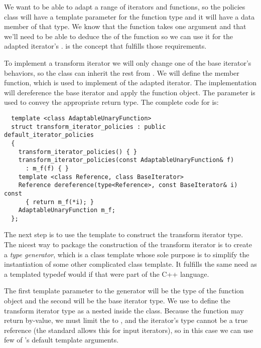\documentclass{netobjectdays}
\begin{document}
We want to be able to adapt a range of iterators and functions, so the
policies class will have a template parameter for the function type
and it will have a data member of that type. We know that the function
takes one argument and that we'll need to be able to deduce the
 of the function so we can use it for the adapted
iterator's .  is
the \textsf{concept}\cite{austern99:_gener_progr_stl} that fulfills
those requirements.

To implement a transform iterator we will only change one of the base
iterator's behaviors, so the 
class can inherit the rest from . We
will define the  member function, which is used
to implement  of the adapted iterator. The
implementation will dereference the base iterator and apply the
function object. The  parameter is used
to convey the appropriate return type. The complete code for
 is:

{\footnotesize
\begin{verbatim}
  template <class AdaptableUnaryFunction>
  struct transform_iterator_policies : public default_iterator_policies
  {
    transform_iterator_policies() { }
    transform_iterator_policies(const AdaptableUnaryFunction& f)
      : m_f(f) { }
    template <class Reference, class BaseIterator>
    Reference dereference(type<Reference>, const BaseIterator& i) const
      { return m_f(*i); }
    AdaptableUnaryFunction m_f;
  };
\end{verbatim}
}

The next step is to use the  template to
construct the transform iterator type. The nicest way to package the
construction of the transform iterator is to create a \emph{type
generator}, which is a class template whose sole purpose is to
simplify the instantiation of some other complicated class
template. It fulfills the same need as a templated typedef would if
that were part of the {C++} language.

The first template parameter to the generator will be the type of the
function object and the second will be the base iterator type. We use
 to define the transform iterator type as a
nested  inside the
 class.  Because the function may
return by-value, we must limit the  to 
, and the iterator's  type cannot be a
true reference (the standard allows this for input iterators), so in
this case we can use few of 's default template
arguments.
\end{document}
